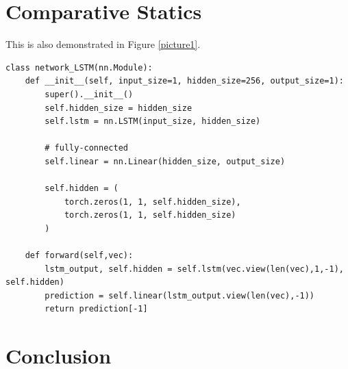 \section{Comparative Statics}
This is also demonstrated in Figure \ref{picture1}.

\begin{lstlisting}[style=python_code, caption={Long short-term memory}, label=mypythoncode]
class network_LSTM(nn.Module):
    def __init__(self, input_size=1, hidden_size=256, output_size=1):
        super().__init__()
        self.hidden_size = hidden_size
        self.lstm = nn.LSTM(input_size, hidden_size)

        # fully-connected
        self.linear = nn.Linear(hidden_size, output_size)

        self.hidden = (
            torch.zeros(1, 1, self.hidden_size),
            torch.zeros(1, 1, self.hidden_size)
        )

    def forward(self,vec):
        lstm_output, self.hidden = self.lstm(vec.view(len(vec),1,-1), self.hidden)
        prediction = self.linear(lstm_output.view(len(vec),-1))
        return prediction[-1]
\end{lstlisting}

\section{Conclusion}
\lipsum[7-9]